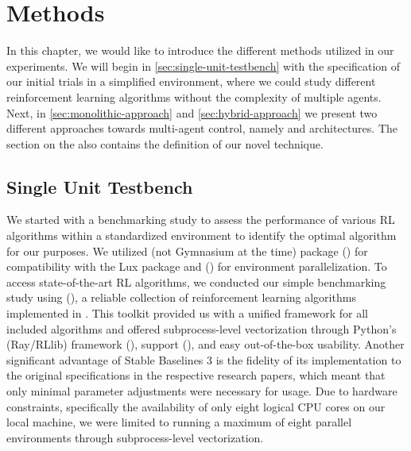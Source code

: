 \chapter{Methods}
\label{ch:meth}

\noindent In this chapter, we would like to introduce the different methods utilized in our experiments. We will begin in \autoref{sec:single-unit-testbench} with the specification of our initial trials in a simplified  environment, where we could study different reinforcement learning algorithms without the complexity of multiple agents. Next, in \autoref{sec:monolithic-approach} and \autoref{sec:hybrid-approach} we present two different approaches towards multi-agent control, namely  and  architectures. The section on the  also contains the definition of our novel  technique.

\section{Single Unit Testbench}
\label{sec:single-unit-testbench}

\noindent We started with a benchmarking study to assess the performance of various RL algorithms within a standardized environment to identify the optimal algorithm for our purposes. We utilized  (not Gymnasium at the time) package (\textcolor{deepblue}{\cite{1606.01540}}) for compatibility with the Lux package and  (\textcolor{deepblue}{\cite{terry2021pettingzoo}}) for environment parallelization. To access state-of-the-art RL algorithms, we conducted our simple benchmarking study using  (\textcolor{deepblue}{\cite{stable-baselines3}}), a reliable collection of reinforcement learning algorithms implemented in . This toolkit provided us with a unified framework for all included algorithms and offered subprocess-level vectorization through Python's  (Ray/RLlib) framework (\textcolor{deepblue}{\cite{moritz2018ray}}),  support (\textcolor{deepblue}{\cite{abadi2016tensorflow}}), and easy out-of-the-box usability. Another significant advantage of Stable Baselines 3 is the fidelity of its implementation to the original specifications in the respective research papers, which meant that only minimal parameter adjustments were necessary for usage. Due to hardware constraints, specifically the availability of only eight logical CPU cores on our local machine, we were limited to running a maximum of eight parallel environments through subprocess-level vectorization.


